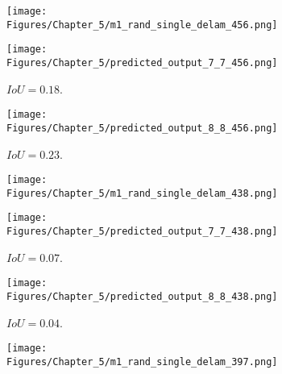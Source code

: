 \begin{figure} [h!]
	\par\medskip
	\begin{subfigure}[b]{0.32\textwidth}
		\centering
		\texttt{[image: Figures/Chapter\_5/m1\_rand\_single\_delam\_456.png]}
		\caption{}
		\label{fig:GT_case_456}
	\end{subfigure}	
	\hfill
	\begin{subfigure}[b]{0.32\textwidth}
		\centering
		\texttt{[image: Figures/Chapter\_5/predicted\_output\_7\_7\_456.png]}
		\caption{\(IoU=0.18\).}
		\label{fig:pred_7_7_case_456}
	\end{subfigure}
	\hfill
	\begin{subfigure}[b]{0.32\textwidth}
		\centering
		\texttt{[image: Figures/Chapter\_5/predicted\_output\_8\_8\_456.png]}
		\caption{\(IoU=0.23\).}
		\label{fig:pred_8_8_case_456}
	\end{subfigure}	
	\par\medskip
	\begin{subfigure}[b]{0.32\textwidth}
		\centering
		\texttt{[image: Figures/Chapter\_5/m1\_rand\_single\_delam\_438.png]}
		\caption{}
		\label{fig:GT_case_438}
	\end{subfigure}
	\hfill
	\begin{subfigure}[b]{0.32\textwidth}
		\centering
		\texttt{[image: Figures/Chapter\_5/predicted\_output\_7\_7\_438.png]}
		\caption{\(IoU=0.07\).}
		\label{fig:pred_7_7_case_438}
	\end{subfigure}
	\hfill
	\begin{subfigure}[b]{0.32\textwidth}
		\centering
		\texttt{[image: Figures/Chapter\_5/predicted\_output\_8\_8\_438.png]}
		\caption{\(IoU=0.04\).}
		\label{fig:pred_8_8_case_438}
	\end{subfigure}
	\par\medskip
	\begin{subfigure}[b]{0.32\textwidth}
		\centering
		\texttt{[image: Figures/Chapter\_5/m1\_rand\_single\_delam\_397.png]}

\end{subfigure}
\end{figure}
